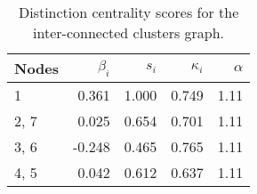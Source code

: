\begin{table}
\centering
\caption{\label{tab:inter}Distinction centrality scores for the inter-connected clusters graph.}
\centering
\begin{tabular}[t]{lrrrr}
\toprule
Nodes & $\beta_i$ & $s_i$ & $\kappa_i$ & $\alpha$\\
\midrule
1 & 0.361 & 1.000 & 0.749 & 1.11\\
2, 7 & 0.025 & 0.654 & 0.701 & 1.11\\
3, 6 & -0.248 & 0.465 & 0.765 & 1.11\\
4, 5 & 0.042 & 0.612 & 0.637 & 1.11\\
\bottomrule
\end{tabular}
\end{table}
